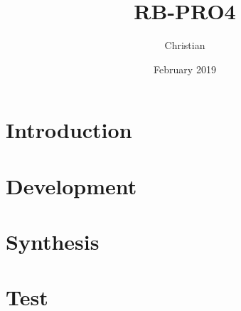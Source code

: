 \documentclass{report}
\title{RB-PRO4}
\author{Christian}
\date{February 2019}
\begin{document}

\maketitle

\begin{abstract}

\end{abstract}

\tableofcontents

\newpage
{}

\chapter{Introduction}


\chapter{Development}


\chapter{Synthesis}


\chapter{Test}


\newpage
\printbibliography
\end{document}

